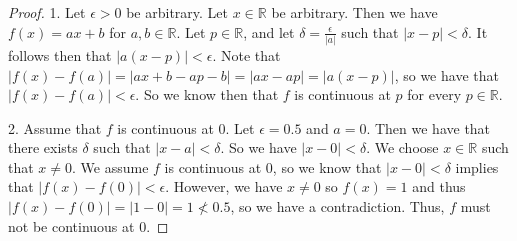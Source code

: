 \documentclass[12pt]{article}
\newcommand{\bbR}{\mathbb{R}}
\renewcommand{\_}[1]{\underline{ #1 }}
\theoremstyle{definition}
\numberwithin{equation}{subsection}
\begin{document}
\begin{proof}
1. Let $\epsilon > 0$ be arbitrary. Let $x \in \bbR$ be arbitrary. Then we have $f(x) = ax + b$ for $a,b \in \bbR$. Let $p \in \bbR$, and let $\delta = \frac{\epsilon}{|a|}$ such that $|x - p| < \delta$. It follows then that $|a(x-p)| < \epsilon$. Note that $|f(x) - f(a)| = |ax + b - ap - b| = |ax - ap| = |a(x-p)|$, so we have that $|f(x) - f(a)| < \epsilon$. So we know then that $f$ is continuous at $p$ for every $p \in \bbR$. \newline

2. Assume that $f$ is continuous at 0. Let $\epsilon = 0.5$ and $a = 0$. Then we have that there exists $\delta$ such that $|x - a| < \delta$. So we have $|x - 0| < \delta$. We choose $x \in \bbR$ such that $x \not = 0$. We assume $f$ is continuous at $0$, so we know that $|x - 0| < \delta$ implies that $|f(x) - f(0)| < \epsilon$. However, we have $x \not = 0$ so $f(x) = 1$ and thus $|f(x) - f(0)| = |1 - 0| = 1 \not < 0.5$, so we have a contradiction. Thus, $f$ must not be continuous at $0$.
\end{proof}
\end{document}
